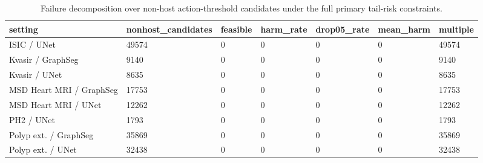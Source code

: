\begin{table}[t]
\centering
\small
\caption{Failure decomposition over non-host action-threshold candidates under the full primary tail-risk constraints.}
\label{tab:tail_risk_failure_decomposition}
\begin{tabular}{lllllll}
\toprule
setting & nonhost\_candidates & feasible & harm\_rate & drop05\_rate & mean\_harm & multiple \\
\midrule
ISIC / UNet & 49574 & 0 & 0 & 0 & 0 & 49574 \\
Kvasir / GraphSeg & 9140 & 0 & 0 & 0 & 0 & 9140 \\
Kvasir / UNet & 8635 & 0 & 0 & 0 & 0 & 8635 \\
MSD Heart MRI / GraphSeg & 17753 & 0 & 0 & 0 & 0 & 17753 \\
MSD Heart MRI / UNet & 12262 & 0 & 0 & 0 & 0 & 12262 \\
PH2 / UNet & 1793 & 0 & 0 & 0 & 0 & 1793 \\
Polyp ext. / GraphSeg & 35869 & 0 & 0 & 0 & 0 & 35869 \\
Polyp ext. / UNet & 32438 & 0 & 0 & 0 & 0 & 32438 \\
\bottomrule
\end{tabular}
\end{table}
